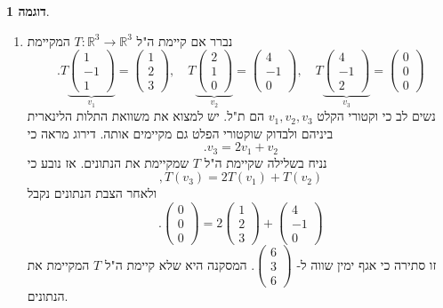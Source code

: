 \documentclass[12pt]{report}
\theoremstyle{plain}
\theoremstyle{definition}
\newtheorem{example}{דוגמה}[chapter]
\newcommand{\R}{\mathbb{R}}
\newcommand{\0}{\mathbf{0}}
\begin{document}
\begin{example}\
\begin{enumerate}[label=\alph*.]
\item
נברר אם קיימת ה"ל
$T:\R^3\to\R^3$
המקיימת
$$
.T\underbrace{\begin{pmatrix}1\\-1\\1\end{pmatrix}}_{v_1}=\begin{pmatrix}1\\2\\3\end{pmatrix},\quad T\underbrace{\begin{pmatrix}2\\1\\0\end{pmatrix}}_{v_2}=\begin{pmatrix}4\\-1\\0\end{pmatrix},\quad T\underbrace{\begin{pmatrix}4\\-1\\2\end{pmatrix}}_{v_3}=\begin{pmatrix}0\\0\\0\end{pmatrix}
$$
נשים לב כי וקטורי הקלט
$v_1,v_2,v_3$
הם ת"ל. יש למצוא את משוואת התלות הלינארית ביניהם ולבדוק שוקטורי הפלט גם מקיימים אותה. דירוג מראה כי
$$
.v_3=2v_1+v_2
$$
נניח בשלילה שקיימת ה"ל 
$T$
שמקיימת את הנתונים. אז נובע כי
$$
,T(v_3)=2T(v_1)+T(v_2)
$$
ולאחר הצבת הנתונים נקבל
$$
.\begin{pmatrix}0\\0\\0\end{pmatrix}=2\begin{pmatrix}1\\2\\3\end{pmatrix}+\begin{pmatrix}4\\-1\\0\end{pmatrix}
$$
זו סתירה כי אגף ימין שווה ל-
$\begin{pmatrix}6\\3\\6\end{pmatrix}$.
המסקנה היא שלא קיימת ה"ל 
$T$
המקיימת את הנתונים.



\end{enumerate}
\end{example}
\end{document}
